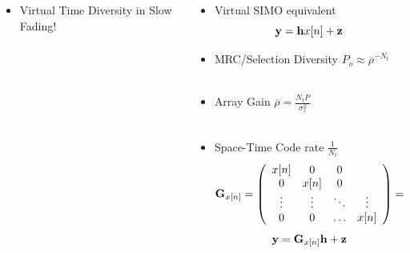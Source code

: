 \documentclass[xcolor=dvipsnames,aspectratio=169]{beamer}
\begin{document}
{\begin{columns}
\begin{column}{5cm}
\begin{figure}
\end{figure}
  \begin{itemize}
   \item Virtual Time Diversity in Slow Fading!
  \end{itemize}
 \end{column}
 \begin{column}{7cm}
  \begin{itemize}
   \item Virtual SIMO equivalent
   $$\mathbf{y}
=\mathbf{h} x[n]+\mathbf{z} $$
   \item MRC/Selection Diversity $P_o\approx \overline{\rho}^{-N_{t}}$\\ \ \\
   \item Array Gain $\overline{\rho}=\frac{N_{t}P}{\sigma_z^2}$\\ \ \\
   \item Space-Time Code rate $\frac{1}{N_{t}}$
   $$\mathbf{G}_{x[n]}=\left(\begin{array}{cccc}
            x[n]&0&0\\
            0&x[n]&0\\
            \vdots&\vdots&\ddots&\vdots\\
            0&0&\dots&x[n]\\
\end{array}\right)=\mathbf{I}_{N_{t}}x[n]$$
   $$\mathbf{y}=\mathbf{G}_{x[n]}\mathbf{h}+\mathbf{z}$$
  \end{itemize}
 \end{column}
\end{columns}
}
\end{document}
